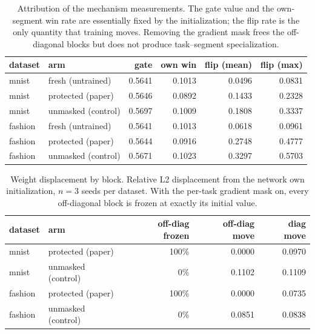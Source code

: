 \documentclass[10pt]{article}
\begin{document}
\begin{table}[h]
\centering\small
\caption{Attribution of the mechanism measurements. The gate value and the own-segment win rate are essentially fixed by the initialization; the flip rate is the only quantity that training moves. Removing the gradient mask frees the off-diagonal blocks but does not produce task--segment specialization.}
\label{tab:sup-attribution}
\begin{tabular}{llrrrr}
\toprule
dataset & arm & gate & own win & flip (mean) & flip (max) \\
\midrule
mnist & fresh (untrained) & 0.5641 & 0.1013 & 0.0496 & 0.0831 \\
mnist & protected (paper) & 0.5646 & 0.0892 & 0.1433 & 0.2328 \\
mnist & unmasked (control) & 0.5697 & 0.1009 & 0.1808 & 0.3337 \\
fashion & fresh (untrained) & 0.5641 & 0.1013 & 0.0618 & 0.0961 \\
fashion & protected (paper) & 0.5644 & 0.0916 & 0.2748 & 0.4777 \\
fashion & unmasked (control) & 0.5671 & 0.1023 & 0.3297 & 0.5703 \\
\bottomrule
\end{tabular}
\end{table}

\begin{table}[h]
\centering\small
\caption{Weight displacement by block. Relative L2 displacement from the network own initialization, $n=3$ seeds per dataset. With the per-task gradient mask on, every off-diagonal block is frozen at exactly its initial value.}
\label{tab:sup-blocks}
\begin{tabular}{llrrr}
\toprule
dataset & arm & off-diag frozen & off-diag move & diag move \\
\midrule
mnist & protected (paper) & 100\% & 0.0000 & 0.0970 \\
mnist & unmasked (control) & 0\% & 0.1102 & 0.1109 \\
fashion & protected (paper) & 100\% & 0.0000 & 0.0735 \\
fashion & unmasked (control) & 0\% & 0.0851 & 0.0838 \\
\bottomrule
\end{tabular}
\end{table}
\end{document}
